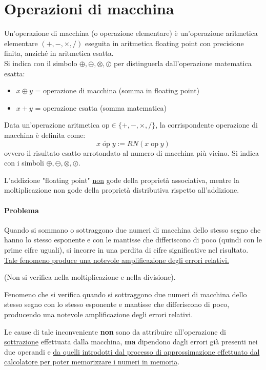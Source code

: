 \documentclass[12pt,a4paper,]{report}
\begin{document}
\section{Operazioni di macchina}

Un'operazione di macchina (o operazione elementare) è un'operazione aritmetica elementare $(+, -, \times, /)$ eseguita in aritmetica floating point con precisione finita, anziché in aritmetica esatta.\\
Si indica con il simbolo $\oplus, \ominus, \otimes, \oslash$ per distinguerla dall'operazione matematica esatta:
\begin{itemize}
    \item $x \oplus y$ = operazione di macchina (somma in floating point)
    \item $x + y$ = operazione esatta (somma matematica)
\end{itemize}

\begin{definizione}
    \label{def: op di macchina}
    Data un'operazione aritmetica $\mathrm{op} \in \{+,-,\times,/\}$, la corrispondente operazione di macchina è definita come:
    \[
        x \;\widetilde{\mathrm{op}}\; y := RN(x \;\mathrm{op}\; y)
    \]
    ovvero il risultato esatto arrotondato al numero di macchina più vicino.
    Si indica con i simboli $\oplus, \ominus, \otimes, \oslash$.
\end{definizione}
\begin{nota}
    L'addizione "floating point" \uline{non} gode della proprietà associativa, mentre la moltiplicazione non gode della proprietà distributiva rispetto all'addizione.
\end{nota}
\paragraph{Problema}
Quando si sommano o sottraggono due numeri di macchina dello stesso segno che hanno lo stesso esponente e con le mantisse che differiscono di poco (quindi con le prime cifre uguali), si incorre in una perdita di cifre significative nel risultato.\\
\uline{Tale fenomeno produce una notevole amplificazione degli errori relativi.}
\begin{nota}
    (Non si verifica nella moltiplicazione e nella divisione).
\end{nota}

\begin{definizione}
    [Cancellazione]
    Fenomeno che si verifica quando si sottraggono due numeri di macchina dello stesso segno con lo stesso esponente e mantisse che differiscono di poco, producendo una notevole amplificazione degli errori relativi.
\end{definizione}
Le cause di tale inconveniente \textbf{non} sono da attribuire all'operazione di \uline{sottrazione} effettuata dalla macchina, \textbf{ma} dipendono dagli errori già presenti nei due operandi e \uline{da quelli introdotti dal processo di approssimazione effettuato dal calcolatore per poter memorizzare i numeri in memoria}.
\end{document}
